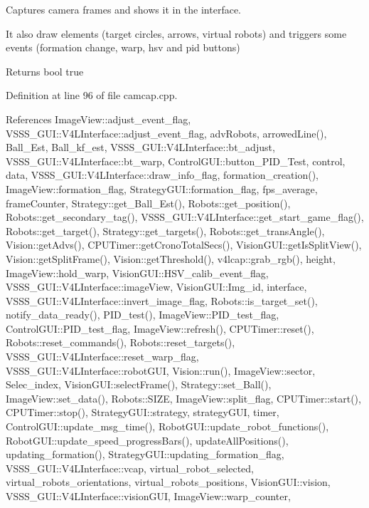 Captures camera frames and shows it in the interface. 

It also draw elements (target circles, arrows, virtual robots) and triggers some events (formation change, warp, hsv and pid buttons) \begin{DoxyReturn}{Returns}
bool true 
\end{DoxyReturn}


Definition at line 96 of file camcap.\+cpp.



References Image\+View\+::adjust\+\_\+event\+\_\+flag, V\+S\+S\+S\+\_\+\+G\+U\+I\+::\+V4\+L\+Interface\+::adjust\+\_\+event\+\_\+flag, adv\+Robots, arrowed\+Line(), Ball\+\_\+\+Est, Ball\+\_\+kf\+\_\+est, V\+S\+S\+S\+\_\+\+G\+U\+I\+::\+V4\+L\+Interface\+::bt\+\_\+adjust, V\+S\+S\+S\+\_\+\+G\+U\+I\+::\+V4\+L\+Interface\+::bt\+\_\+warp, Control\+G\+U\+I\+::button\+\_\+\+P\+I\+D\+\_\+\+Test, control, data, V\+S\+S\+S\+\_\+\+G\+U\+I\+::\+V4\+L\+Interface\+::draw\+\_\+info\+\_\+flag, formation\+\_\+creation(), Image\+View\+::formation\+\_\+flag, Strategy\+G\+U\+I\+::formation\+\_\+flag, fps\+\_\+average, frame\+Counter, Strategy\+::get\+\_\+\+Ball\+\_\+\+Est(), Robots\+::get\+\_\+position(), Robots\+::get\+\_\+secondary\+\_\+tag(), V\+S\+S\+S\+\_\+\+G\+U\+I\+::\+V4\+L\+Interface\+::get\+\_\+start\+\_\+game\+\_\+flag(), Robots\+::get\+\_\+target(), Strategy\+::get\+\_\+targets(), Robots\+::get\+\_\+trans\+Angle(), Vision\+::get\+Advs(), C\+P\+U\+Timer\+::get\+Crono\+Total\+Secs(), Vision\+G\+U\+I\+::get\+Is\+Split\+View(), Vision\+::get\+Split\+Frame(), Vision\+::get\+Threshold(), v4lcap\+::grab\+\_\+rgb(), height, Image\+View\+::hold\+\_\+warp, Vision\+G\+U\+I\+::\+H\+S\+V\+\_\+calib\+\_\+event\+\_\+flag, V\+S\+S\+S\+\_\+\+G\+U\+I\+::\+V4\+L\+Interface\+::image\+View, Vision\+G\+U\+I\+::\+Img\+\_\+id, interface, V\+S\+S\+S\+\_\+\+G\+U\+I\+::\+V4\+L\+Interface\+::invert\+\_\+image\+\_\+flag, Robots\+::is\+\_\+target\+\_\+set(), notify\+\_\+data\+\_\+ready(), P\+I\+D\+\_\+test(), Image\+View\+::\+P\+I\+D\+\_\+test\+\_\+flag, Control\+G\+U\+I\+::\+P\+I\+D\+\_\+test\+\_\+flag, Image\+View\+::refresh(), C\+P\+U\+Timer\+::reset(), Robots\+::reset\+\_\+commands(), Robots\+::reset\+\_\+targets(), V\+S\+S\+S\+\_\+\+G\+U\+I\+::\+V4\+L\+Interface\+::reset\+\_\+warp\+\_\+flag, V\+S\+S\+S\+\_\+\+G\+U\+I\+::\+V4\+L\+Interface\+::robot\+G\+UI, Vision\+::run(), Image\+View\+::sector, Selec\+\_\+index, Vision\+G\+U\+I\+::select\+Frame(), Strategy\+::set\+\_\+\+Ball(), Image\+View\+::set\+\_\+data(), Robots\+::\+S\+I\+ZE, Image\+View\+::split\+\_\+flag, C\+P\+U\+Timer\+::start(), C\+P\+U\+Timer\+::stop(), Strategy\+G\+U\+I\+::strategy, strategy\+G\+UI, timer, Control\+G\+U\+I\+::update\+\_\+msg\+\_\+time(), Robot\+G\+U\+I\+::update\+\_\+robot\+\_\+functions(), Robot\+G\+U\+I\+::update\+\_\+speed\+\_\+progress\+Bars(), update\+All\+Positions(), updating\+\_\+formation(), Strategy\+G\+U\+I\+::updating\+\_\+formation\+\_\+flag, V\+S\+S\+S\+\_\+\+G\+U\+I\+::\+V4\+L\+Interface\+::vcap, virtual\+\_\+robot\+\_\+selected, virtual\+\_\+robots\+\_\+orientations, virtual\+\_\+robots\+\_\+positions, Vision\+G\+U\+I\+::vision, V\+S\+S\+S\+\_\+\+G\+U\+I\+::\+V4\+L\+Interface\+::vision\+G\+UI, Image\+View\+::warp\+\_\+counter, 